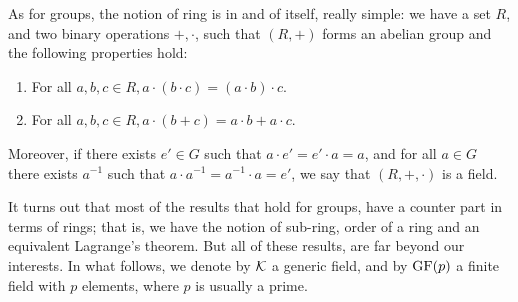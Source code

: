 \documentclass{subfiles}
\begin{document}
    As for groups, the notion of ring is in and of itself, really simple:
        we have a set $R$, and two binary operations $+, \cdot$,
        such that $(R, +)$ forms an abelian group and the following properties hold:
        \begin{enumerate}
            \item For all $a, b, c \in R, a \cdot (b \cdot c) = (a \cdot b) \cdot c$.
            \item For all $a, b, c \in R, a \cdot (b + c) = a \cdot b + a \cdot c$. 
        \end{enumerate}
        Moreover, if there exists $e' \in G$ such that $a \cdot e' = e' \cdot a = a$,
        and for all $a \in G$ there exists $a^{-1}$ such that $a \cdot a^{-1} = a^{-1} \cdot a = e'$,
        we say that $(R, +, \cdot)$ is a field.

    It turns out that most of the results that hold for groups, have a counter part in terms of rings;
        that is, we have the notion of sub-ring, order of a ring and an equivalent Lagrange's theorem.
        But all of these results, are far beyond our interests.
        In what follows, we denote by $\mathcal{K}$ a generic field,
        and by $\operatorname{GF}(p)$ a finite field with $p$ elements, where $p$ is usually a prime.
\end{document}
